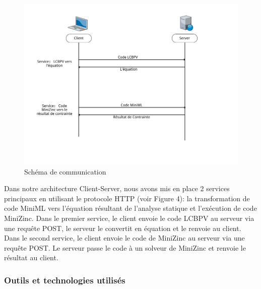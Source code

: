 \documentclass[12pt]{article}
\begin{document}
\begin{figure}
  \centering
  \includegraphics{Figures/Communication.png}
  \caption{Schéma de communication}
\end{figure}

\newpage

Dans notre architecture Client-Server, nous avons mis en place 2
services principaux en utilisant le protocole HTTP (voir Figure 4): la
transformation de code MiniML vers l'équation résultant de l'analyse
statique et l'exécution de code MiniZinc. Dans le premier service, le
client envoie le code LCBPV au serveur via une requête POST, le serveur
le convertit en équation et le renvoie au client. Dans le second
service, le client envoie le code de MiniZinc au serveur via une requête
POST. Le serveur passe le code à un solveur de MiniZinc et renvoie le
résultat au client.

\hypertarget{outils-et-technologies-utilisuxe9s-1}{%
  \subsubsection{Outils et technologies
    utilisés}\label{outils-et-technologies-utilisuxe9s-1}}
\end{document}
